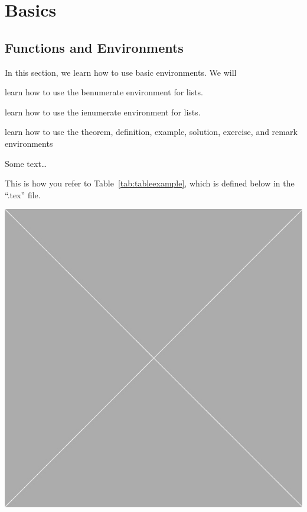 \documentclass[10pt,oneside]{book}
\begin{document}
\chapter{Basics}
\chaptertoc


\section{Functions and Environments}

\begin{objectives}{In this section, we learn how to use basic environments. We will}
  \item
    learn how to use the benumerate environment for lists.
  \item
    learn how to use the ienumerate environment for lists.
  \item
    learn how to use the theorem, definition, example, solution, exercise, and remark environments
\end{objectives}


Some text\ldots

This is how you refer to Table~\ref{tab:tableexample}, which is defined below in
the ``.tex'' file.

\begin{marginfigure}
    \includegraphics[width=\linewidth]{Pictures/placeholder.jpg}
    \caption{This is a how you put a figure in the margin.}
    \label{fig:marginfig2}
\end{marginfigure}
\end{document}
